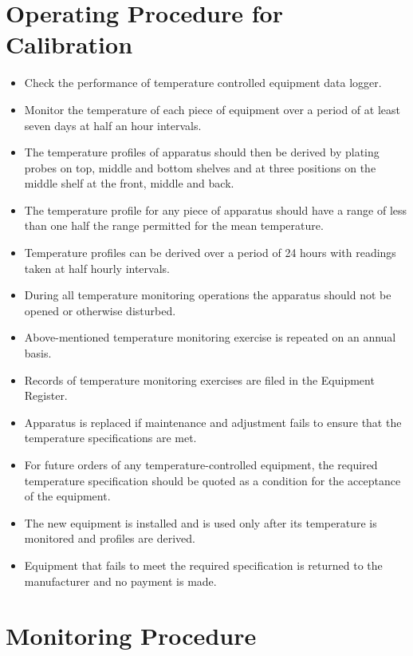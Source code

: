 \documentclass[]{book}
\providecommand{\tightlist}{%
  \setlength{\itemsep}{0pt}\setlength{\parskip}{0pt}}
\begin{document}
\section{Operating Procedure for
Calibration}\label{operating-procedure-for-calibration-1}

\begin{itemize}
\tightlist
\item
  Check the performance of temperature controlled equipment data logger.
\item
  Monitor the temperature of each piece of equipment over a period of at
  least seven days at half an hour intervals.
\item
  The temperature profiles of apparatus should then be derived by
  plating probes on top, middle and bottom shelves and at three
  positions on the middle shelf at the front, middle and back.
\item
  The temperature profile for any piece of apparatus should have a range
  of less than one half the range permitted for the mean temperature.
\item
  Temperature profiles can be derived over a period of 24 hours with
  readings taken at half hourly intervals.
\item
  During all temperature monitoring operations the apparatus should not
  be opened or otherwise disturbed.
\item
  Above-mentioned temperature monitoring exercise is repeated on an
  annual basis.
\item
  Records of temperature monitoring exercises are filed in the Equipment
  Register.
\item
  Apparatus is replaced if maintenance and adjustment fails to ensure
  that the temperature specifications are met.
\item
  For future orders of any temperature-controlled equipment, the
  required temperature specification should be quoted as a condition for
  the acceptance of the equipment.
\item
  The new equipment is installed and is used only after its temperature
  is monitored and profiles are derived.
\item
  Equipment that fails to meet the required specification is returned to
  the manufacturer and no payment is made.
\end{itemize}

\section{Monitoring Procedure}\label{monitoring-procedure}
\end{document}
